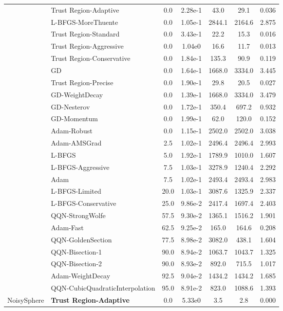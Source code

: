 \documentclass{article}
\begin{document}
\begin{table}[htbp]
{\begin{tabular}{p{2.5cm}p{2.5cm}*{5}{c}}
 & Trust Region-Adaptive & 0.0 & 2.28e-1 & 43.0 & 29.1 & 0.036 \\
 & L-BFGS-MoreThuente & 0.0 & 1.05e-1 & 2844.1 & 2164.6 & 2.875 \\
 & Trust Region-Standard & 0.0 & 3.43e-1 & 22.2 & 15.3 & 0.016 \\
 & Trust Region-Aggressive & 0.0 & 1.04e0 & 16.6 & 11.7 & 0.013 \\
 & Trust Region-Conservative & 0.0 & 1.84e-1 & 135.3 & 90.9 & 0.119 \\
 & GD & 0.0 & 1.64e-1 & 1668.0 & 3334.0 & 3.445 \\
 & Trust Region-Precise & 0.0 & 1.90e-1 & 29.8 & 20.5 & 0.027 \\
 & GD-WeightDecay & 0.0 & 1.39e-1 & 1668.0 & 3334.0 & 3.479 \\
 & GD-Nesterov & 0.0 & 1.72e-1 & 350.4 & 697.2 & 0.932 \\
 & GD-Momentum & 0.0 & 1.99e-1 & 62.0 & 120.0 & 0.152 \\
 & Adam-Robust & 0.0 & 1.15e-1 & 2502.0 & 2502.0 & 3.038 \\
 & Adam-AMSGrad & 2.5 & 1.02e-1 & 2496.4 & 2496.4 & 2.993 \\
 & L-BFGS & 5.0 & 1.92e-1 & 1789.9 & 1010.0 & 1.607 \\
 & L-BFGS-Aggressive & 7.5 & 1.03e-1 & 3278.9 & 1240.4 & 2.292 \\
 & Adam & 7.5 & 1.02e-1 & 2493.4 & 2493.4 & 2.983 \\
 & L-BFGS-Limited & 20.0 & 1.03e-1 & 3087.6 & 1325.9 & 2.337 \\
 & L-BFGS-Conservative & 25.0 & 9.86e-2 & 2417.4 & 1697.4 & 2.403 \\
 & QQN-StrongWolfe & 57.5 & 9.30e-2 & 1365.1 & 1516.2 & 1.901 \\
 & Adam-Fast & 62.5 & 9.25e-2 & 165.0 & 164.6 & 0.208 \\
 & QQN-GoldenSection & 77.5 & 8.98e-2 & 3082.0 & 438.1 & 1.604 \\
 & QQN-Bisection-1 & 90.0 & 8.94e-2 & 1063.7 & 1043.7 & 1.325 \\
 & QQN-Bisection-2 & 90.0 & 8.93e-2 & 892.0 & 715.5 & 1.017 \\
 & Adam-WeightDecay & 92.5 & 9.04e-2 & 1434.2 & 1434.2 & 1.685 \\
 & QQN-CubicQuadraticInterpolation & 95.0 & 8.91e-2 & 823.0 & 1088.6 & 1.393 \\
\midrule
\multirow{25}{*}{NoisySphere} & \textbf{Trust Region-Adaptive} & 0.0 & 5.33e0 & 3.5 & 2.8 & 0.000 \\

\end{tabular}}
\end{table}
\end{document}
